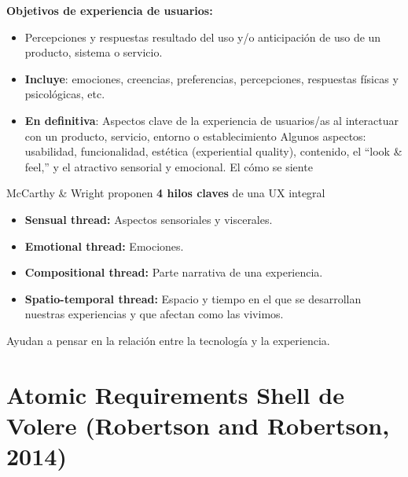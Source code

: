 \documentclass[12pt, twoside, openright]{report} %
\begin{document}
\textbf{Objetivos de experiencia de usuarios:}

\begin{itemize}
	\item Percepciones y respuestas resultado del uso y/o anticipación de uso de
	      un producto, sistema o servicio.
	\item \textbf{Incluye}: emociones, creencias, preferencias, percepciones, respuestas
	      físicas y psicológicas, etc.
	\item \textbf{En definitiva}: Aspectos clave de la experiencia de usuarios/as al
	      interactuar con un producto, servicio, entorno o establecimiento
	      Algunos aspectos: usabilidad, funcionalidad, estética (experiential
	      quality), contenido, el ``look \& feel,'' y el atractivo sensorial y
	      emocional. El cómo se siente
\end{itemize}

McCarthy \& Wright proponen \textbf{4 hilos claves} de una UX integral

\begin{itemize}
	\item \textbf{Sensual thread:} Aspectos sensoriales y viscerales.
	\item \textbf{Emotional thread:} Emociones.
	\item \textbf{Compositional thread:} Parte narrativa de una experiencia.
	\item \textbf{Spatio-temporal thread:} Espacio y tiempo en el que se desarrollan
	      nuestras experiencias y que afectan como las vivimos.
\end{itemize}

Ayudan a pensar en la relación entre la tecnología y la experiencia.

\newpage

\section{Atomic Requirements Shell de Volere (Robertson and
  Robertson, 2014)}
\end{document}
